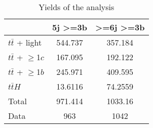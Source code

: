 \documentclass[10pt]{article}
\begin{document}
\begin{table}[htbp]
\begin{center}
\begin{tabular}{|l|S|S|}
\hline 
 & {5j >=3b} & {>=6j >=3b}\\
\hline 
  $t\bar{t}$ + light   & 544.737  & 357.184  \\ 
  $t\bar{t}$ + $\geq$1$c$   & 167.095  & 192.122  \\ 
  $t\bar{t}$ + $\geq$1$b$   & 245.971  & 409.595  \\ 
  $t\bar{t}H$   & 13.6116  & 74.2559  \\ 
\hline 
  Total  & 971.414  & 1033.16  \\ 
\hline 
  Data   & 963 & 1042 \\ 
\hline 
\end{tabular} 
\caption{Yields of the analysis} 
\end{center} 
\end{table} 
\end{document}
